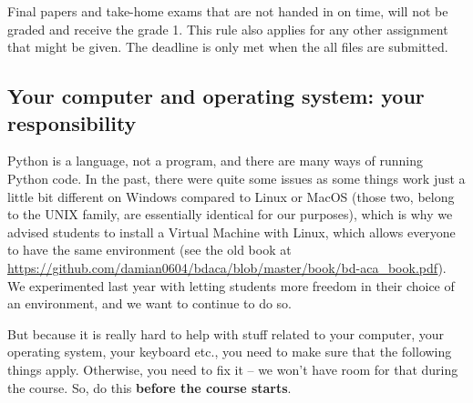 \documentclass[a4paper,10pt,twocolumn]{report}
\newenvironment{corona}{%
	\begin{shaded*}%
	}{%
	\end{shaded*}%
}
\begin{document}
Final papers and take-home exams that are not handed in on time, will not be graded and receive the grade 1. This rule also applies for any other assignment that might be given. The deadline is only met when the all files are submitted.

\begin{corona}
\section{Your computer and operating system: your responsibility}	
\label{sec:yourcomputer}
Python is a language, not a program, and there are many ways of running Python code. In the past, there were quite some issues as some things work just a little bit different on Windows compared to Linux or MacOS (those two, belong to the UNIX family, are essentially identical for our purposes), which is why we advised students to install a Virtual Machine with Linux, which allows everyone to have the same environment (see the old book at \url{https://github.com/damian0604/bdaca/blob/master/book/bd-aca_book.pdf}). We experimented last year with letting students more freedom in their choice of an environment, and we want to continue to do so.

But because it is really hard to help with stuff related to your computer, your operating system, your keyboard etc., you need to make sure that the following things apply. Otherwise, you need to fix it -- we won't have room for that during the course. So, do this \textbf{before the course starts}.


\end{corona}
\end{document}
